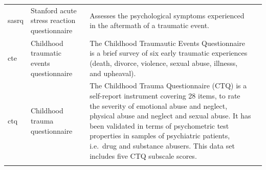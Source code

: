 \documentclass[]{book}
\begin{document}
\begin{longtable}[]{@{}llll@{}}
\begin{minipage}[t]{0.22\columnwidth}
sasrq\strut
\end{minipage} & \begin{minipage}[t]{0.27\columnwidth}\raggedright
Stanford acute stress reaction questionnaire\strut
\end{minipage} & \begin{minipage}[t]{0.22\columnwidth}\raggedright
Assesses the psychological symptoms experienced in the aftermath of a traumatic event.\strut
\end{minipage} & \begin{minipage}[t]{0.18\columnwidth}\raggedright
\strut
\end{minipage}\tabularnewline
\begin{minipage}[t]{0.22\columnwidth}\raggedright
cte\strut
\end{minipage} & \begin{minipage}[t]{0.27\columnwidth}\raggedright
Childhood traumatic events questionnaire\strut
\end{minipage} & \begin{minipage}[t]{0.22\columnwidth}\raggedright
The Childhood Traumautic Events Questionnaire is a brief survey of six early traumatic experiences (death, divorce, violence, sexual abuse, illnesss, and upheaval).\strut
\end{minipage} & \begin{minipage}[t]{0.18\columnwidth}\raggedright
\strut
\end{minipage}\tabularnewline
\begin{minipage}[t]{0.22\columnwidth}\raggedright
ctq\strut
\end{minipage} & \begin{minipage}[t]{0.27\columnwidth}\raggedright
Childhood trauma questionnaire\strut
\end{minipage} & \begin{minipage}[t]{0.22\columnwidth}\raggedright
The Childhood Trauma Questionnaire (CTQ) is a self-report instrument covering 28 items, to rate the severity of emotional abuse and neglect, physical abuse and neglect and sexual abuse. It has been validated in terms of psychometric test properties in samples of psychiatric patients, i.e.~drug and substance abusers. This data set includes five CTQ subscale scores.\strut
\end{minipage} & \begin{minipage}[t]{0.18\columnwidth}\raggedright
\strut
\end{minipage}\tabularnewline
\begin{minipage}[t]{0.22\columnwidth}\raggedright

\end{minipage}
\end{longtable}
\end{document}

